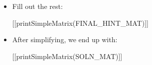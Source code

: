 \documentclass{article}
\begin{document}
\begin{itemize}
            
                
                    [[printSimpleMatrix(
                            maskMatrix(FINAL\_HINT\_MAT, [[1, 1], [2, 1]])
                        )]]
  \item Fill out the rest:
            
            
                
                    [[printSimpleMatrix(FINAL\_HINT\_MAT)]]
  \item After simplifying, we end up with:
            
                
                    [[printSimpleMatrix(SOLN\_MAT)]]
\end{itemize}
\end{document}
